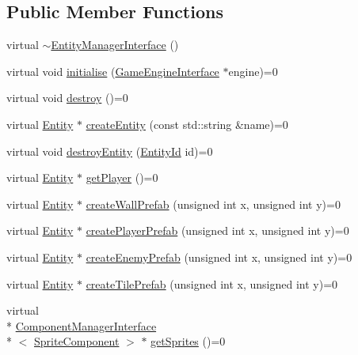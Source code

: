 \subsection*{Public Member Functions}
\begin{DoxyCompactItemize}
\item 
virtual \hyperlink{classEntityManagerInterface_a4991d0d31ad6f551335bbc2c65383a9f}{$\sim$\-Entity\-Manager\-Interface} ()
\item 
virtual void \hyperlink{classEntityManagerInterface_aeb1fd14604e776e874765fa708a7ce26}{initialise} (\hyperlink{classGameEngineInterface}{Game\-Engine\-Interface} $\ast$engine)=0
\item 
virtual void \hyperlink{classEntityManagerInterface_ab27d9f7d97a914785cc5955076c10d70}{destroy} ()=0
\item 
virtual \hyperlink{classEntity}{Entity} $\ast$ \hyperlink{classEntityManagerInterface_a95ba3a0c18e752b97de7b6a3ffd0301f}{create\-Entity} (const std\-::string \&name)=0
\item 
virtual void \hyperlink{classEntityManagerInterface_a01d56437b2df1ba882da83e5f6aaa163}{destroy\-Entity} (\hyperlink{entity_8h_a3812b46f7256476cf244cbc0f4a3bde9}{Entity\-Id} id)=0
\item 
virtual \hyperlink{classEntity}{Entity} $\ast$ \hyperlink{classEntityManagerInterface_af59c4f44e337dc04fd7aac61e80b2660}{get\-Player} ()=0
\item 
virtual \hyperlink{classEntity}{Entity} $\ast$ \hyperlink{classEntityManagerInterface_a9aae8cf72f08ee33ea110325148ef613}{create\-Wall\-Prefab} (unsigned int x, unsigned int y)=0
\item 
virtual \hyperlink{classEntity}{Entity} $\ast$ \hyperlink{classEntityManagerInterface_aca4bf34ec9006329027f134575a8b844}{create\-Player\-Prefab} (unsigned int x, unsigned int y)=0
\item 
virtual \hyperlink{classEntity}{Entity} $\ast$ \hyperlink{classEntityManagerInterface_a9060a65f6799126b3b7827bdd2636e92}{create\-Enemy\-Prefab} (unsigned int x, unsigned int y)=0
\item 
virtual \hyperlink{classEntity}{Entity} $\ast$ \hyperlink{classEntityManagerInterface_aa98d0ba0e59103d9aeb7a367fe04c571}{create\-Tile\-Prefab} (unsigned int x, unsigned int y)=0
\item 
virtual \\*
\hyperlink{classComponentManagerInterface}{Component\-Manager\-Interface}\\*
$<$ \hyperlink{structSpriteComponent}{Sprite\-Component} $>$ $\ast$ \hyperlink{classEntityManagerInterface_a91bd6cea03b2b69ddec735e116420dd6}{get\-Sprites} ()=0

\end{DoxyCompactItemize}
